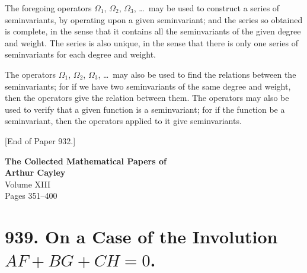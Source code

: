 \documentclass[11pt,a4paper]{book}
\begin{document}
{{{\setcounter{art}{81}
\begin{art}
The foregoing operators $\Omega_{1}$, $\Omega_{2}$, $\Omega_{3}$, \ldots\ may be used to construct a series of seminvariants, by operating upon a given seminvariant; and the series so obtained is complete, in the sense that it contains all the seminvariants of the given degree and weight. The series is also unique, in the sense that there is only one series of seminvariants for each degree and weight.
\end{art}

\setcounter{art}{82}
\begin{art}
The operators $\Omega_{1}$, $\Omega_{2}$, $\Omega_{3}$, \ldots\ may also be used to find the relations between the seminvariants; for if we have two seminvariants of the same degree and weight, then the operators give the relation between them. The operators may also be used to verify that a given function is a seminvariant; for if the function be a seminvariant, then the operators applied to it give seminvariants.
\end{art}

\vspace{1cm}
\begin{center}
[End of Paper 932.]
\end{center}
\clearpage


\begin{center}
{\Large \textbf{The Collected Mathematical Papers of\\Arthur Cayley}}\\[6pt]
{\large Volume XIII}\\[12pt]
{\large Pages 351--400}\\[24pt]
\end{center}

\thispagestyle{empty}
\newpage
\setcounter{page}{351}

\section*{939. On a Case of the Involution $AF + BG + CH = 0$.}

}}}
\end{document}
